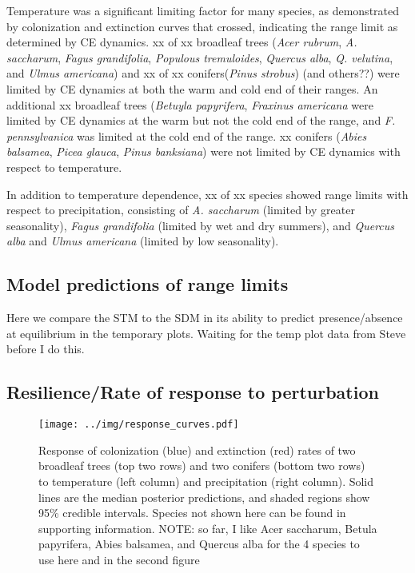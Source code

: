 \documentclass[11pt]{article}
\begin{document}
Temperature was a significant limiting factor for many species, as demonstrated by colonization and extinction curves that crossed, indicating the range limit as determined by CE dynamics.
xx of xx broadleaf trees (\emph{Acer rubrum}, \emph{A. saccharum}, \emph{Fagus grandifolia}, \emph{Populous tremuloides}, \emph{Quercus alba}, \emph{Q. velutina}, and \emph{Ulmus americana}) and xx of xx conifers(\emph{Pinus strobus}) (and others??) were limited by CE dynamics at both the warm and cold end of their ranges.
An additional xx broadleaf trees (\emph{Betuyla papyrifera}, \emph{Fraxinus americana} were limited by CE dynamics at the warm but not the cold end of the range, and \emph{F. pennsylvanica} was limited at the cold end of the range.
xx conifers (\emph{Abies balsamea}, \emph{Picea glauca}, \emph{Pinus banksiana}) were not limited by CE dynamics with respect to temperature.

In addition to temperature dependence, xx of xx species showed range limits with respect to precipitation, consisting of \emph{A. saccharum} (limited by greater seasonality), \emph{Fagus grandifolia} (limited by wet and dry summers), and \emph{Quercus alba} and \emph{Ulmus americana} (limited by low seasonality).

\subsection*{Model predictions of range limits}
Here we compare the STM to the SDM in its ability to predict presence/absence at equilibrium in the temporary plots.
Waiting for the temp plot data from Steve before I do this.

\subsection*{Resilience/Rate of response to perturbation}

\begin{figure}
	\texttt{[image: ../img/response\_curves.pdf]}
	\caption{
		Response of colonization (blue) and extinction (red) rates of two broadleaf trees (top two rows) and two conifers (bottom two rows) to temperature (left column) and precipitation (right column).
		Solid lines are the median posterior predictions, and shaded regions show 95\% credible intervals.
		Species not shown here can be found in supporting information.
		NOTE: so far, I like Acer saccharum, Betula papyrifera, Abies balsamea, and Quercus alba for the 4 species to use here and in the second figure
	}
	\label{fig:response_curves}
\end{figure}
\end{document}
